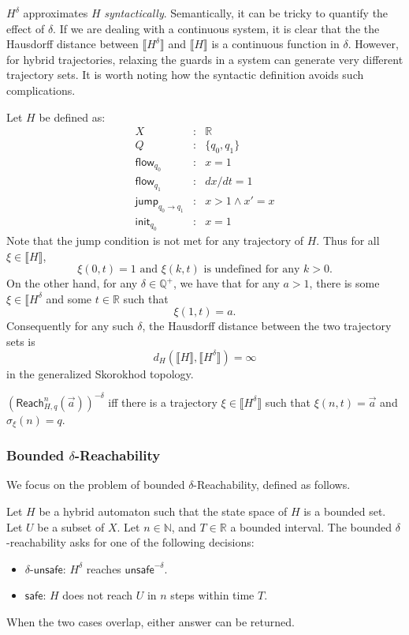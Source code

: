 \documentclass[envcountsect]{llncs}
\newcommand{\flow}{\mathsf{flow}}
\newcommand{\jump}{\mathsf{jump}}
\newcommand{\init}{\mathsf{init}}
\newcommand{\reach}{\mathsf{Reach}}
\newcommand{\unsafe}{\mathsf{unsafe}}
\newcommand{\safe}{\mathsf{safe}}
\begin{document}
\begin{remark}
$H^{\delta}$ approximates $H$ {\em syntactically}. Semantically, it can be tricky to quantify the effect of $\delta$. If we are dealing with a continuous system, it is clear that the the Hausdorff distance between $\llbracket H^{\delta}\rrbracket$ and $\llbracket H\rrbracket$ is a continuous function in $\delta$. However, for hybrid trajectories, relaxing the guards in a system can generate very different trajectory sets. It is worth noting how the syntactic definition avoids such complications. 
\end{remark}
\begin{example}
Let $H$ be defined as:
\begin{eqnarray*} 
X &:& \mathbb{R}\\
Q &:& \{q_0, q_1\}\\
\flow_{q_0} &:& x = 1\\
\flow_{q_1} &:& dx/dt = 1\\
\jump_{q_0\rightarrow q_1} &:& x >1 \wedge x' = x\\
\init_{q_0} &:& x=1
\end{eqnarray*}
Note that the jump condition is not met for any trajectory of $H$. Thus for all $\xi\in \llbracket H\rrbracket$, 
$$\xi(0, t) = 1\mbox{ and }\xi(k,t)\mbox{ is undefined for any $k>0$.}$$
On the other hand, for any $\delta\in \mathbb{Q}^+$, we have that for any $a > 1$, there is some $\xi\in \llbracket H^{\delta}$ and some $t\in \mathbb{R}$ such that
$$\xi(1, t) = a.$$
Consequently for any such $\delta$, the Hausdorff distance between the two trajectory sets is
$$d_{H}(\llbracket H\rrbracket, \llbracket H^{\delta}\rrbracket) = \infty$$
in the generalized Skorokhod topology. 
\end{example}

\begin{proposition}\label{equiv-delta}
$(\reach_{H,q}^n(\vec a))^{-\delta}$ iff there is a trajectory $\xi\in \llbracket H^{\delta}\rrbracket$ such that $\xi(n, t) = \vec a$ and $\sigma_{\xi}(n) = q$.  
\end{proposition}

\subsubsection{Bounded $\delta$-Reachability}

We focus on the problem of bounded $\delta$-Reachability, defined as follows. 

\begin{definition}
Let $H$ be a hybrid automaton such that the state space of $H$ is a bounded set. Let $U$ be a subset of $X$. Let $n\in \mathbb{N}$, and $T\in \mathbb{R}$ a bounded interval. The bounded $\delta$-reachability asks for one of the following decisions:
\begin{itemize}
\item $\delta$-$\unsafe$: $H^{\delta}$ reaches $\unsafe^{-\delta}$.  
\item $\safe$: $H$ does not reach $U$ in $n$ steps within time $T$. 
\end{itemize} 
When the two cases overlap, either answer can be returned. 
\end{definition}
\end{document}
